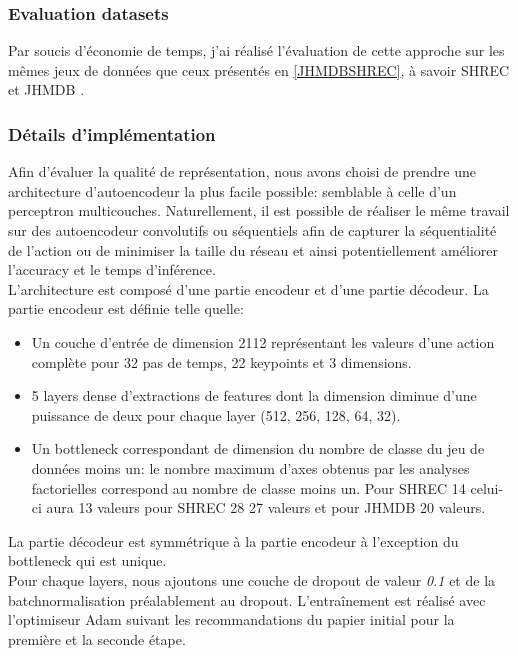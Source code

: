 \subsubsection{Evaluation datasets}
Par soucis d'économie de temps, j'ai réalisé l'évaluation de cette approche sur les mêmes jeux de données que ceux présentés en \ref{JHMDBSHREC}, à savoir SHREC \cite{de2017shrec} et JHMDB \cite{jhuang2013towards}.\\

\subsubsection{Détails d'implémentation}

Afin d'évaluer la qualité de représentation, nous avons choisi de prendre une architecture d'autoencodeur la plus facile possible: semblable à celle d'un perceptron multicouches. Naturellement, il est possible de réaliser le même travail sur des autoencodeur convolutifs ou séquentiels afin de capturer la séquentialité de l'action ou de minimiser la taille du réseau et ainsi potentiellement améliorer l'accuracy et le temps d'inférence.\\

L'architecture est composé d'une partie encodeur et d'une partie décodeur.
La partie encodeur est définie telle quelle:
\begin{itemize}
    \item Un couche d'entrée de dimension 2112 représentant les valeurs d'une action complète pour 32 pas de temps, 22 keypoints et  3 dimensions.
    \item 5 layers dense d'extractions de features dont la dimension diminue d'une puissance de deux pour chaque layer (512, 256, 128, 64, 32).
    \item Un bottleneck correspondant de dimension du nombre de classe du jeu de données moins un: le nombre maximum d'axes obtenus par les analyses factorielles correspond au nombre de classe moins un. Pour SHREC 14 celui-ci aura 13 valeurs pour SHREC 28 27 valeurs et pour JHMDB 20 valeurs.
\end{itemize}

La partie décodeur est symmétrique à la partie encodeur à l'exception du bottleneck qui est unique.\\
Pour chaque layers, nous ajoutons une couche de dropout de valeur \textit{0.1} et de la batchnormalisation préalablement au dropout.
L’entraînement est réalisé avec l'optimiseur Adam \cite{kingma2014adam} suivant les recommandations du papier initial pour la première et la seconde étape.\\

